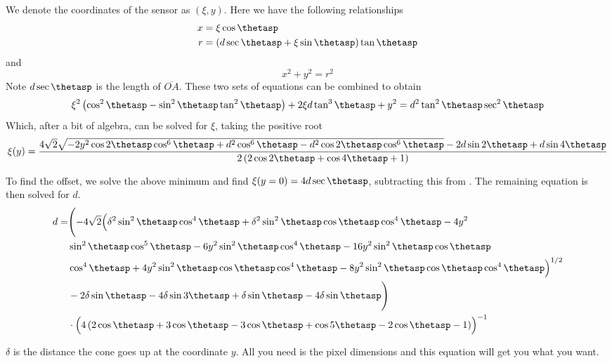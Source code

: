 We denote the coordinates of the sensor as $(\xi,y)$.  Here we have the
following relationships
\begin{align}
x &= \xi \cos \thetasp\\
r &= \left(d \sec \thetasp + \xi \sin \thetasp\right) \tan\thetasp
\end{align}
and
\begin{equation}
x^2+y^2=r^2
\end{equation}
Note $d \sec\thetasp$ is the length of $\overline{OA}$.  These two sets of
equations can be combined to obtain
\begin{equation}
\xi^2 \left(\cos ^2\thetasp-\sin ^2\thetasp \tan
^2\thetasp\right)+2 \xi d \tan ^3\thetasp+y^2=d^2 \tan
^2\thetasp \sec ^2\thetasp
\end{equation}
Which, after a bit of algebra, can be solved for $\xi$, taking
the positive root
\begin{equation}
\xi(y) = \frac{4 \sqrt{2} \sqrt{-2 y^2 \cos 2 \thetasp  \cos ^6\thetasp +d^2
\cos ^6\thetasp -d^2 \cos 2 \thetasp  \cos^6\thetasp}-2 d \sin 2 \thetasp
+d \sin 4 \thetasp }{2 \left(2 \cos 2 \thetasp +\cos 4 \thetasp +1\right)}
\label{eqn:conic02}
\end{equation}

To find the offset, we solve the above minimum and find $\xi(y=0) = 4 d
\sec\thetasp$, subtracting this from .  The remaining
equation is then solved for $d$.
\begin{align}
d =& \Biggl(-4 \sqrt{2} \Bigl(\delta^2 \sin ^2\thetasp \cos
^4\thetasp+\delta^2 \sin ^2\thetasp \cos \thetasp \cos ^4\thetasp-4 y^2 \\
   & \sin ^2\thetasp \cos ^5\thetasp-6 y^2 \sin ^2\thetasp
     \cos ^4\thetasp-16 y^2 \sin ^2\thetasp \cos \thetasp\\
  & \cos ^4\thetasp+4 y^2 \sin ^2\thetasp \cos \thetasp
    \cos ^4\thetasp-8 y^2 \sin ^2\thetasp \cos \thetasp \cos
    ^4\thetasp\Bigr)^{1/2}\\
&-2 \delta\sin \thetasp-4 \delta \sin 3 \thetasp+\delta  \sin \thetasp-4 \delta \sin \thetasp\Biggr)\\
&\cdot\Bigl(4 \left(2 \cos \thetasp+3 \cos \thetasp-3 \cos \thetasp+\cos 5 \thetasp-2 \cos \thetasp-1\right)\Bigr)^{-1}
\end{align}


$\delta$ is the distance the cone goes up at the coordinate $y$.  All you
need is the pixel dimensions and this equation will get you what you want.
